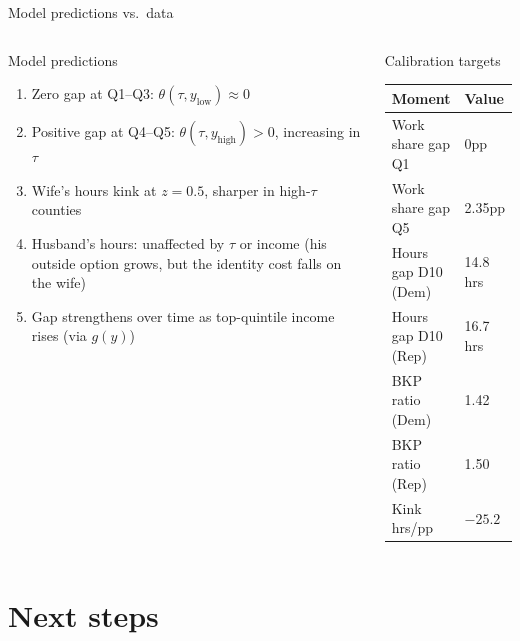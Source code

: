 \documentclass[10pt,aspectratio=169]{beamer}
\begin{document}
\begin{frame}{Model predictions vs.\ data}
  \begin{columns}[c]
      \begin{block}{Model predictions}
        \begin{enumerate}
          \item Zero gap at Q1–Q3: $\theta(\tau, y_{\text{low}}) \approx 0$
          \item Positive gap at Q4–Q5: $\theta(\tau, y_{\text{high}}) > 0$,
                increasing in $\tau$
          \item Wife's hours kink at $z = 0.5$, sharper in high-$\tau$ counties
          \item Husband's hours: unaffected by $\tau$ or income (his outside
                option grows, but the identity cost falls on the wife)
          \item Gap strengthens over time as top-quintile income rises
                (via $g(y)$)
        \end{enumerate}
      \end{block}
      \begin{exampleblock}{Calibration targets}
        \begin{tabular}{ll}
          \toprule
          Moment & Value \\
          \midrule
          Work share gap Q1 & 0pp \\
          Work share gap Q5 & 2.35pp \\
          Hours gap D10 (Dem) & 14.8 hrs \\
          Hours gap D10 (Rep) & 16.7 hrs \\
          BKP ratio (Dem)  & 1.42 \\
          BKP ratio (Rep)  & 1.50 \\
          Kink hrs/pp      & $-25.2$ \\
          \bottomrule
        \end{tabular}
      \end{exampleblock}
  \end{columns}
\end{frame}

\section{Next steps}
\end{document}
